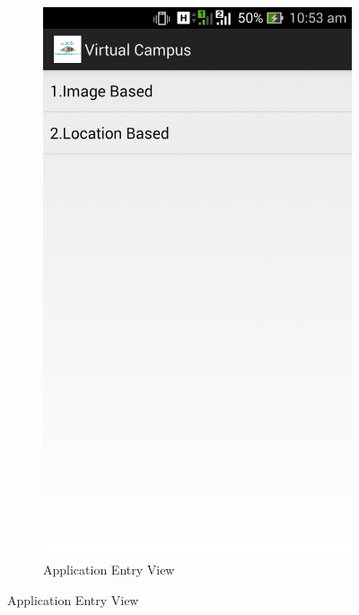 \documentclass{article}
\begin{document}
\begin{figure}[h]
\begin{subfigure}[b]{0.4\textwidth}
  \includegraphics[scale=1,trim=0 50cm 0 0,clip=true]{AppEntryView.jpg}
    \caption{Application Entry View}
    \label{fig:2}
  \end{subfigure}
\end{figure}
\fi
\end{document}
